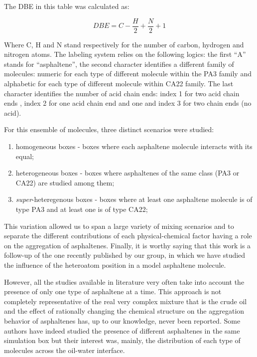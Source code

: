 The DBE in this table was calculated as:

\begin{equation}
DBE = C - \frac{H}{2} + \frac{N}{2} +1
\end{equation}

Where C, H and N stand respectively for the number of carbon, hydrogen and nitrogen atoms. The labeling system relies on the following logics: the first ``A'' stands for ``asphaltene'', the second character identifies a different family of molecules: numeric for each type of different molecule within the PA3 family and alphabetic for each type of different molecule within CA22 family. The last character identifies the number of acid chain ends: index 1 for two acid chain ends , index 2 for one acid chain  end and one  and index 3 for two  chain ends (no acid).

For this ensemble of molecules, three distinct scenarios were studied:

\begin{enumerate}
	\item homogeneous boxes - boxes where each asphaltene molecule interacts with its equal;
	\item heterogeneous boxes - boxes where asphaltenes of the same class (PA3 or CA22) are studied among them;
	\item  \textit{super}-heteregenous boxes - boxes where at least one asphaltene molecule is of type PA3 and at least one is of type CA22; 
\end{enumerate}

This variation allowed us to span a large variety of mixing scenarios and to separate the different contributions of each physical-chemical factor having a role on the aggregation of asphaltenes. Finally, it is worthy saying that this work is a follow-up of the one recently published by our group,\cite{sodero2016investigation} in which we have studied the influence of the heteroatom position in a model asphaltene molecule.

However, all the studies available in literature very often take into account the presence of only one type of asphaltene at a time. This approach is not completely representative of the real very complex mixture that is the crude oil and the effect of rationally changing the chemical structure on the aggregation behavior of asphaltenes has, up to our knowledge, never been reported. Some authors have indeed studied the presence of different asphaltenes in the same simulation box but their interest was, mainly, the distribution of each type of molecules across the oil-water interface.\cite{frigerio2011multiscale,mikami2013molecular,yang2015asphaltene}

